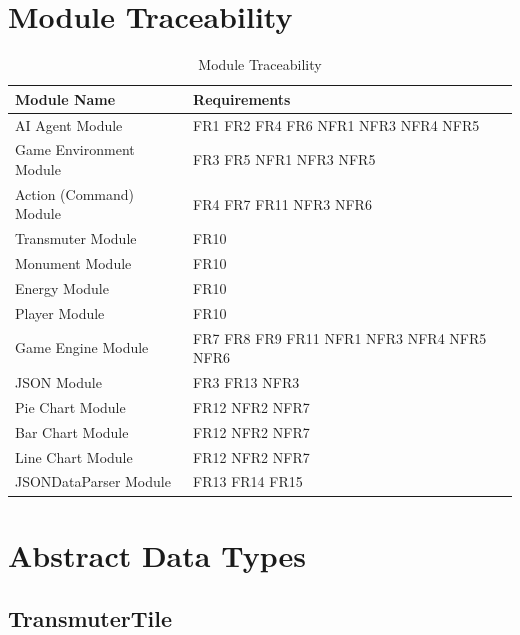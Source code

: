 \documentclass[12pt, titlepage]{article}
\begin{document}
\newpage
\section{Module Traceability}
\begin{table}[h!]
\centering
\begin{tabular}{p{} p{}}
\toprule
\textbf{Module Name} & \textbf{Requirements}\\
\midrule

\multirow{1}{0.4\textwidth}{AI Agent Module} & FR1 FR2 FR4 FR6 NFR1 NFR3 NFR4 NFR5\\
\multirow{1}{0.4\textwidth}{Game Environment Module} & FR3 FR5 NFR1 NFR3 NFR5\\
\midrule
\multirow{1}{0.4\textwidth}{Action (Command) Module} & FR4 FR7 FR11 NFR3 NFR6\\
\multirow{1}{0.4\textwidth}{Transmuter Module} & FR10 \\
\multirow{1}{0.4\textwidth}{Monument Module} & FR10 \\
\multirow{1}{0.4\textwidth}{Energy Module} & FR10 \\
\multirow{1}{0.4\textwidth}{Player Module} & FR10 \\
\multirow{1}{0.4\textwidth}{Game Engine Module} & FR7 FR8 FR9 FR11 NFR1 NFR3 NFR4 NFR5 NFR6\\
\midrule

\multirow{1}{0.4\textwidth}{JSON Module} & FR3 FR13 NFR3\\
\multirow{1}{0.4\textwidth}{Pie Chart Module} & FR12 NFR2 NFR7\\
\multirow{1}{0.4\textwidth}{Bar Chart Module} & FR12 NFR2 NFR7\\
\multirow{1}{0.4\textwidth}{Line Chart Module} & FR12 NFR2 NFR7\\
\multirow{1}{0.4\textwidth}{JSONDataParser Module} & FR13 FR14 FR15\\
\bottomrule

\end{tabular}
\caption{Module Traceability}
\label{TblMH}
\end{table}

\newpage
\section{Abstract Data Types}
\subsection{TransmuterTile}
\end{document}
